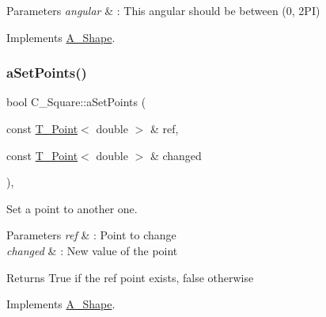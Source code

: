 \begin{DoxyParams}{Parameters}
{\em angular} & \+: This angular should be between (0, 2\+PI) \\
\hline
\end{DoxyParams}


Implements \hyperlink{classA__Shape_a25b4e0c34cdb46da5382fe9c7467efaf}{A\+\_\+\+Shape}.

\mbox{\label{classC__Square_a295a170686422b745587a250ebe08a5e}} 
\subsubsection{\texorpdfstring{a\+Set\+Points()}{aSetPoints()}\hspace{0.1cm}{\footnotesize\ttfamily [1/2]}}
{\footnotesize\ttfamily bool C\+\_\+\+Square\+::a\+Set\+Points (\begin{DoxyParamCaption}\item[{const \hyperlink{classT__Point}{T\+\_\+\+Point}$<$ double $>$ \&}]{ref,  }\item[{const \hyperlink{classT__Point}{T\+\_\+\+Point}$<$ double $>$ \&}]{changed }\end{DoxyParamCaption})\hspace{0.3cm}{\ttfamily [override]}, {\ttfamily [virtual]}}



Set a point to another one. 


\begin{DoxyParams}{Parameters}
{\em ref} & \+: Point to change \\
\hline
{\em changed} & \+: New value of the point \\
\hline
\end{DoxyParams}
\begin{DoxyReturn}{Returns}
True if the ref point exists, false otherwise 
\end{DoxyReturn}


Implements \hyperlink{classA__Shape_a6996f454b337f8425ad13cba3f7a7c35}{A\+\_\+\+Shape}.

\mbox{\label{classC__Square_a295a170686422b745587a250ebe08a5e}} 
